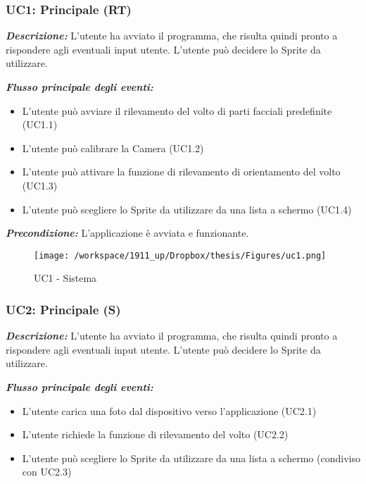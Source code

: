 \subsubsection{UC1: Principale (RT)}

\textbf{\textit{Descrizione:}} L'utente ha avviato il programma, che risulta quindi pronto a rispondere agli eventuali input utente. L'utente può decidere lo Sprite da utilizzare.

\textbf{\textit{Flusso principale degli eventi:}} 

\begin{itemize}
\item L'utente può avviare il rilevamento del volto di parti facciali predefinite (UC1.1)
\item L'utente può calibrare la Camera (UC1.2)
\item L'utente può attivare la funzione di rilevamento di orientamento del volto (UC1.3)
\item L'utente può scegliere lo Sprite da utilizzare da una lista a schermo (UC1.4)
\end{itemize}

\textbf{\textit{Precondizione:}} L'applicazione è avviata e funzionante.


\begin{figure}[H]\centering  
\texttt{[image: /workspace/1911\_up/Dropbox/thesis/Figures/uc1.png]}
\caption[UC1 - Sistema]{UC1 - Sistema}
\label{pic-a}
\end{figure}


\subsubsection{UC2: Principale (S)}

\textbf{\textit{Descrizione:}} L'utente ha avviato il programma, che risulta quindi pronto a rispondere agli eventuali input utente. L'utente può decidere lo Sprite da utilizzare.

\textbf{\textit{Flusso principale degli eventi:}} 

\begin{itemize}
\item L'utente carica una foto dal dispositivo verso l'applicazione (UC2.1)
\item L'utente richiede la funzione di rilevamento del volto (UC2.2)
\item L'utente può scegliere lo Sprite da utilizzare da una lista a schermo (condiviso con UC2.3)
\end{itemize}

